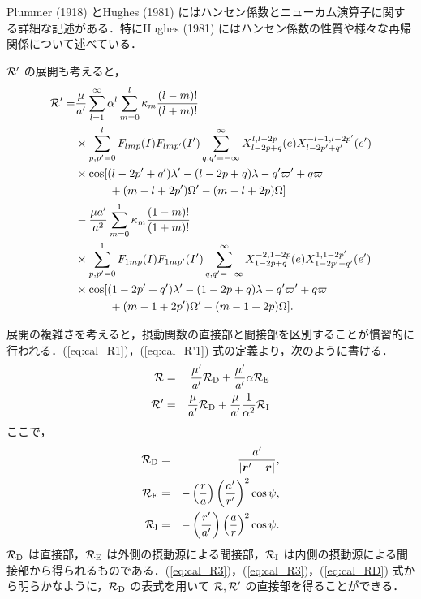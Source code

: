\documentclass[11pt,a4paper,oneside,onecolumn]{jarticle}
\begin{document}
Plummer (1918) とHughes (1981) にはハンセン係数とニューカム演算子に関する詳細な記述がある．特にHughes (1981) にはハンセン係数の性質や様々な再帰関係について述べている．

${\cal R'}$ の展開も考えると，
\begin{equation}
\begin{split}
{\cal R'} = & \frac{\mu}{a'} \sum_{l = 1}^{\infty} \alpha^l \sum_{m = 0}^l \kappa_m \frac{(l - m) !}{(l + m) !} \\
& \times \sum_{p,p' = 0}^l F_{lmp} (I) F_{lmp'} (I') \sum_{q,q' = - \infty}^{\infty} X_{l - 2p + q}^{l, l - 2p} (e) X_{l - 2p' + q'}^{-l -1, l - 2p'} (e') \\
& \times \cos [ (l - 2p' + q') \lambda' - (l - 2p + q) \lambda - q' \varpi' + q \varpi \\
& \quad \quad \quad + (m - l + 2p') \Omega' - (m - l + 2p) \Omega ] \\
& - \frac{\mu a'}{a^2} \sum_{m = 0}^1 \kappa_m \frac{(1 - m) !}{(1 + m) !} \\
& \times \sum_{p,p' = 0}^1 F_{1mp} (I) F_{1mp'} (I') \sum_{q,q' = - \infty}^{\infty} X_{1 - 2p + q}^{-2, 1 - 2p} (e) X_{1 - 2p' + q'}^{1, 1 - 2p'} (e') \\
& \times \cos [ (1 - 2p' +q') \lambda' - (1 -2p + q) \lambda - q' \varpi' +q \varpi \\
& \quad \quad \quad + (m - 1 + 2p') \Omega' - (m - 1 + 2p) \Omega ].
\end{split}
\end{equation}

展開の複雑さを考えると，摂動関数の直接部と間接部を区別することが慣習的に行われる．(\ref{eq:cal_R1})，(\ref{eq:cal_R'1}) 式の定義より，次のように書ける．
\begin{eqnarray}
{\cal R} & = & \frac{\mu'}{a'} {\cal R}_{\rm D} + \frac{\mu'}{a'} \alpha {\cal R}_{\rm E} \label{eq:cal_R3} \\
{\cal R'} & = & \frac{\mu}{a'} {\cal R}_{\rm D} + \frac{\mu}{a'} \frac{1}{\alpha^2} {\cal R}_{\rm I} \label{eq:cal_R'3}
\end{eqnarray}
ここで，
\begin{eqnarray}
{\cal R}_{\rm D} & = & \frac{a'}{|{\bm r'} - {\bm r}|}, \label{eq:cal_RD}\\
{\cal R}_{\rm E} & = & - \left( \frac{r}{a} \right) \left( \frac{a'}{r'} \right)^2 \cos \psi, \label{eq:cal_RE} \\
{\cal R}_{\rm I} & = & - \left( \frac{r'}{a'} \right) \left( \frac{a}{r} \right)^2 \cos \psi. \label{eq:cal_RI}
\end{eqnarray}
${\cal R}_{\rm D}$ は直接部，${\cal R}_{\rm E}$ は外側の摂動源による間接部，${\cal R}_{\rm I}$ は内側の摂動源による間接部から得られるものである．(\ref{eq:cal_R3})，(\ref{eq:cal_R3})，(\ref{eq:cal_RD}) 式から明らかなように，${\cal R}_{\rm D}$ の表式を用いて ${\cal R}, {\cal R'}$ の直接部を得ることができる．
\end{document}
